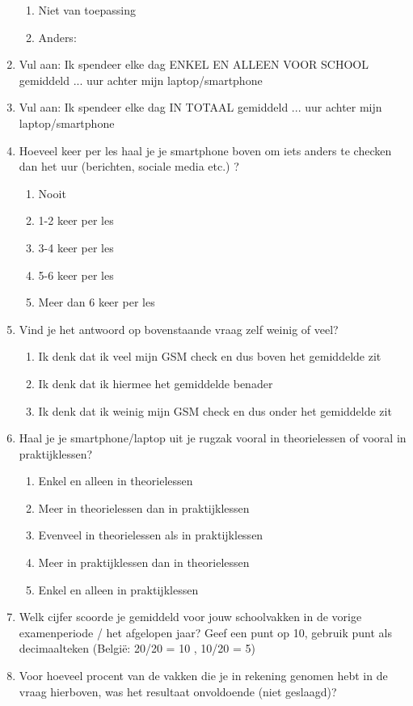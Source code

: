 \begin{enumerate}
\begin{enumerate}
		\item Niet van toepassing
		\item Anders:
	\end{enumerate}
	\item Vul aan: Ik spendeer elke dag ENKEL EN ALLEEN VOOR SCHOOL gemiddeld ... uur achter mijn laptop/smartphone
	\item Vul aan: Ik spendeer elke dag IN TOTAAL gemiddeld ... uur achter mijn laptop/smartphone
	\item Hoeveel keer per les haal je je smartphone boven om iets anders te checken dan het uur (berichten, sociale media etc.) ?
	\begin{enumerate}
		\item Nooit
		\item 1-2 keer per les
		\item 3-4 keer per les
		\item 5-6 keer per les
		\item Meer dan 6 keer per les
	\end{enumerate}
	\item Vind je het antwoord op bovenstaande vraag zelf weinig of veel?
	\begin{enumerate}
		\item Ik denk dat ik veel mijn GSM check en dus boven het gemiddelde zit
		\item Ik denk dat ik hiermee het gemiddelde benader
		\item Ik denk dat ik weinig mijn GSM check en dus onder het gemiddelde zit
	\end{enumerate}
	\item Haal je je smartphone/laptop uit je rugzak vooral in theorielessen of vooral in praktijklessen?
	\begin{enumerate}
		\item Enkel en alleen in theorielessen
		\item Meer in theorielessen dan in praktijklessen
		\item Evenveel in theorielessen als in praktijklessen
		\item Meer in praktijklessen dan in theorielessen
		\item Enkel en alleen in praktijklessen
	\end{enumerate}
	\item Welk cijfer scoorde je gemiddeld voor jouw schoolvakken in de vorige examenperiode / het afgelopen jaar?
	Geef een punt op 10, gebruik punt als decimaalteken	(België: 20/20 = 10 , 10/20 = 5)
	\item Voor hoeveel procent van de vakken die je in rekening genomen hebt in de vraag hierboven, was het resultaat onvoldoende (niet geslaagd)?

\end{enumerate}
